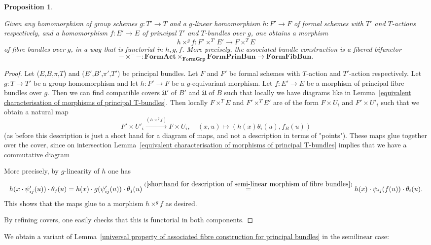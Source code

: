 \documentclass[10pt,oneside]{amsart}
\newtheorem{proposition}[theorem]{Proposition}
\theoremstyle{definition}
\theoremstyle{remark}
\begin{document}
	\begin{proposition}\label{associated bundle construction in the semi-linear case is a sort of fibered bifunctor}
		
		Given any homomorphism of group schemes $g:T'\rightarrow T$ and a $g$-linear homomorphism $h:F'\rightarrow F$ of formal schemes with $T'$ and $T$-actions respectively, and a homomorphism $f:E'\rightarrow E$ of principal $T'$ and $T$-bundles over $g$, one obtains a morphism
		\[h\times^g f : F'\times^{T'}E'\rightarrow F\times^T E\]
		of fibre bundles over $g$, in a way that is functorial in $h,g,f$. 
		More precisely, the associated bundle construction is a fibered bifunctor
		\[-\times^{-}-: \mathbf{FormAct} \times_{\mathbf{FormGrp}} \mathbf{FormPrinBun}\rightarrow \mathbf{FormFibBun}. \]
	\end{proposition}
	\begin{proof}
		Let ($E$,$B$,$\pi$,$T$) and ($E'$,$B'$,$\pi'$,$T'$) be principal bundles. Let $F$ and $F'$ be formal schemes with $T$-action and $T'$-action respectively. Let $g:T\rightarrow T'$ be a group homomorphism and let $h:F'\rightarrow F$ be a $g$-equivariant morphism.
		Let $f:E'\rightarrow E$ be a morphism of principal fibre bundles over $g$.
		Then we can find compatible covers $\mathfrak U'$ of $B'$ and $\mathfrak U$ of $B$ such that locally we have diagrams like in Lemma~\ref{equivalent characterisation of morphisms of principal T-bundles}. Then locally $F\times^T E$ and $F'\times^T E'$ are of the form $F\times U_i$ and $F'\times U'_i$ such that we obtain a natural map
		\[F'\times U'_i\xrightarrow{(h\times^g f)} F\times U_i, \quad (x,u)\mapsto (h(x)\theta_i(u),f_B(u))\]
		(as before this description is just a short hand for a diagram of maps, and not a description in terms of "points"). These maps glue together over the cover, since on intersection Lemma~\ref{equivalent characterisation of morphisms of principal T-bundles} implies that we have a commutative diagram
		\begin{center}
		\end{center}
		More precisely, by $g$-linearity of $h$ one has
		\[h(x\cdot\psi_{ij}'(u))\cdot \theta_j(u)  =  h(x)\cdot g(\psi_{ij}'(u))\cdot \theta_j(u)  \stackrel{(\ref{shorthand for description of semi-linear morphism of fibre  bundles})}{=} h(x)\cdot \psi_{ij}(f(u))\cdot \theta_i(u).\]
		This shows that the maps glue to a morphism $h\times^g f$ as desired.
		
		By refining covers, one easily checks that this is functorial in both components.
	\end{proof}
	We obtain a variant of Lemma~\ref{universal property of associated fibre construction for principal bundles} in the semilinear case:
	
\end{document}
